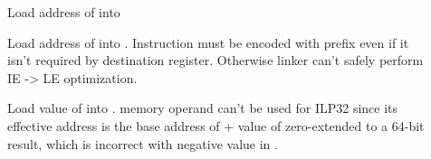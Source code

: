 \begin{description}
\item[]
  Load address of  into 

\begin{table}[H]
\Hrule
\caption{General Dynamic Model Code Sequence}
\begin{center}
\small{}
\end{center}
\Hrule
\end{table}

\item[]
  Load address of  into .  Instruction 
  must be encoded with  prefix even if it isn't required by
  destination register.  Otherwise linker can't safely perform IE -> LE
  optimization.

\begin{table}[H]
\Hrule
\caption{Initial Exec Model Code Sequence}
\begin{center}
\small{}
\end{center}
\Hrule
\end{table}

\item[]
  Load value of  into .   memory
  operand can't be used for ILP32 since its effective address is the base
  address of  + value of  zero-extended to a 64-bit
  result, which is incorrect with negative value in .


\end{description}
